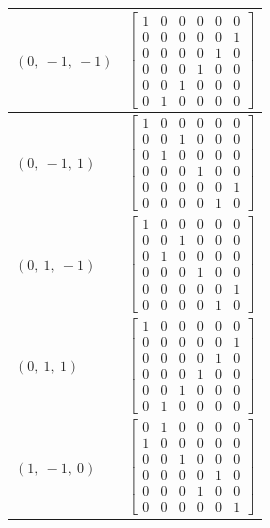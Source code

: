 \documentclass[11pt]{article}
\theoremstyle{definition}
\begin{document}
\begin{longtable}{|l|c|}
    \hline
    $\left( 0, \  -1, \  -1\right)$ & ${\left[\begin{matrix}1 & 0 & 0 & 0 & 0 & 0\\0 & 0 & 0 & 0 & 0 & 1\\0 & 0 & 0 & 0 & 1 & 0\\0 & 0 & 0 & 1 & 0 & 0\\0 & 0 & 1 & 0 & 0 & 0\\0 & 1 & 0 & 0 & 0 & 0\end{matrix}\right]}$ \\
    \hline
    $\left( 0, \  -1, \  1\right)$ & ${\left[\begin{matrix}1 & 0 & 0 & 0 & 0 & 0\\0 & 0 & 1 & 0 & 0 & 0\\0 & 1 & 0 & 0 & 0 & 0\\0 & 0 & 0 & 1 & 0 & 0\\0 & 0 & 0 & 0 & 0 & 1\\0 & 0 & 0 & 0 & 1 & 0\end{matrix}\right]}$ \\
    \hline
    $\left( 0, \  1, \  -1\right)$ & ${\left[\begin{matrix}1 & 0 & 0 & 0 & 0 & 0\\0 & 0 & 1 & 0 & 0 & 0\\0 & 1 & 0 & 0 & 0 & 0\\0 & 0 & 0 & 1 & 0 & 0\\0 & 0 & 0 & 0 & 0 & 1\\0 & 0 & 0 & 0 & 1 & 0\end{matrix}\right]}$ \\
    \hline
    $\left( 0, \  1, \  1\right)$ & ${\left[\begin{matrix}1 & 0 & 0 & 0 & 0 & 0\\0 & 0 & 0 & 0 & 0 & 1\\0 & 0 & 0 & 0 & 1 & 0\\0 & 0 & 0 & 1 & 0 & 0\\0 & 0 & 1 & 0 & 0 & 0\\0 & 1 & 0 & 0 & 0 & 0\end{matrix}\right]}$ \\
    \hline
    $\left( 1, \  -1, \  0\right)$ & ${\left[\begin{matrix}0 & 1 & 0 & 0 & 0 & 0\\1 & 0 & 0 & 0 & 0 & 0\\0 & 0 & 1 & 0 & 0 & 0\\0 & 0 & 0 & 0 & 1 & 0\\0 & 0 & 0 & 1 & 0 & 0\\0 & 0 & 0 & 0 & 0 & 1\end{matrix}\right]}$ \\

\end{longtable}
\end{document}
